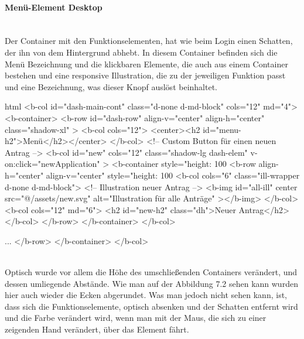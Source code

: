 \paragraph{Menü-Element Desktop}
~\\
Der Container mit den Funktionselementen, hat wie beim Login einen Schatten, der ihn von dem Hintergrund abhebt. In diesem Container befinden sich die Menü Bezeichnung und die klickbaren Elemente, die auch aus einem Container bestehen und eine responsive Illustration, die zu der jeweiligen Funktion passt und eine Bezeichnung, was dieser Knopf auslöst beinhaltet.
\begin{code}{html}
<b-col id="dash-main-cont" class="d-none d-md-block" cols="12" md="4">
	<b-container>
		<b-row
			id="dash-row"
			align-v="center"
			align-h="center"
			class="shadow-xl"
		>
			<b-col cols="12">
				<center><h2 id="menu-h2">Menü</h2></center>
			</b-col>
			<!-- Custom Button für einen neuen Antrag -->
			<b-col
				id="new"
				cols="12"
				class="shadow-lg dash-elem"
				v-on:click="newApplication"
			>
				<b-container style="height: 100%
					<b-row align-h="center" align-v="center" style="height: 100%
						<b-col cols="6" class="ill-wrapper d-none d-md-block">
						<!-- Illustration neuer Antrag -->
							<b-img
								id="all-ill"
								center
								src="@/assets/new.svg"
								alt="Illustration für alle Anträge"
							></b-img>
						</b-col>
						<b-col cols="12" md="6">
							<h2 id="new-h2" class="dh">Neuer Antrag</h2>
						</b-col>
					</b-row>
				</b-container>
			</b-col>
			
			...
		</b-row>
	</b-container>
</b-col>
\end{code}
	\label{list:menuhtml} ~\\
Optisch wurde vor allem die Höhe des umschließenden Containers verändert, und dessen umliegende Abstände. Wie man auf der Abbildung 7.2 sehen kann wurden hier auch wieder die Ecken abgerundet. Was man jedoch nicht sehen kann, ist, dass sich die Funktionselemente, optisch absenken und der Schatten entfernt wird und die Farbe verändert wird, wenn man mit der Maus, die sich zu einer zeigenden Hand verändert, über das Element fährt. 
	\label{list:cssmenu} ~\\
